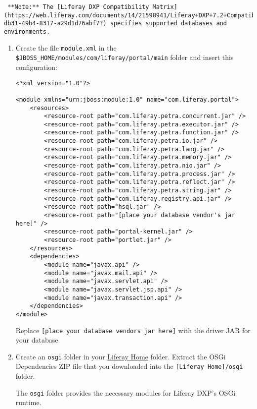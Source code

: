 \noindent\hrulefill

\begin{verbatim}
 **Note:** The [Liferay DXP Compatibility Matrix](https://web.liferay.com/documents/14/21598941/Liferay+DXP+7.2+Compatibility+Matrix/b6e0f064-db31-49b4-8317-a29d1d76abf7?) specifies supported databases and environments.
\end{verbatim}

\noindent\hrulefill

\begin{enumerate}
\def\labelenumi{\arabic{enumi}.}
\setcounter{enumi}{2}
\item
  Create the file \texttt{module.xml} in the
  \texttt{\$JBOSS\_HOME/modules/com/liferay/portal/main} folder and
  insert this configuration:

\begin{verbatim}
<?xml version="1.0"?>

<module xmlns="urn:jboss:module:1.0" name="com.liferay.portal">
    <resources>
        <resource-root path="com.liferay.petra.concurrent.jar" />
        <resource-root path="com.liferay.petra.executor.jar" />
        <resource-root path="com.liferay.petra.function.jar" />
        <resource-root path="com.liferay.petra.io.jar" />
        <resource-root path="com.liferay.petra.lang.jar" />
        <resource-root path="com.liferay.petra.memory.jar" />
        <resource-root path="com.liferay.petra.nio.jar" />
        <resource-root path="com.liferay.petra.process.jar" />
        <resource-root path="com.liferay.petra.reflect.jar" />
        <resource-root path="com.liferay.petra.string.jar" />
        <resource-root path="com.liferay.registry.api.jar" />
        <resource-root path="hsql.jar" />
        <resource-root path="[place your database vendor's jar here]" />
        <resource-root path="portal-kernel.jar" />
        <resource-root path="portlet.jar" />
    </resources>
    <dependencies>
        <module name="javax.api" />
        <module name="javax.mail.api" />
        <module name="javax.servlet.api" />
        <module name="javax.servlet.jsp.api" />
        <module name="javax.transaction.api" />
    </dependencies>
</module>
\end{verbatim}

  Replace
  \texttt{{[}place\ your\ database\ vendor\textquotesingle{}s\ jar\ here{]}}
  with the driver JAR for your database.
\item
  Create an \texttt{osgi} folder in your
  \href{/docs/7-2/deploy/-/knowledge_base/d/liferay-home}{Liferay Home}
  folder. Extract the OSGi Dependencies ZIP file that you downloaded
  into the \texttt{{[}Liferay\ Home{]}/osgi} folder.

  The \texttt{osgi} folder provides the necessary modules for Liferay
  DXP's OSGi runtime.
\end{enumerate}

